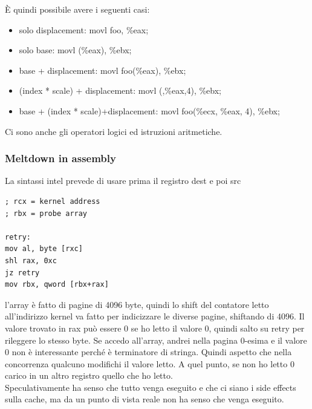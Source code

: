 \documentclass[12pt, oneside]{extbook}
\begin{document}
È quindi possibile avere i seguenti casi:
\begin{itemize}
\item solo displacement: \textsf{movl foo, \%eax};
\item solo base: \textsf{movl (\%eax), \%ebx};
\item base + displacement: \textsf{movl foo(\%eax), \%ebx};
\item (index * scale) + displacement: \textsf{movl (,\%eax,4), \%ebx};
\item base + (index * scale)+displacement: \textsf{movl foo(\%ecx, \%eax, 4), \%ebx};
\end{itemize}
Ci sono anche gli operatori logici ed istruzioni aritmetiche.
\subsubsection{Meltdown in assembly}
La sintassi intel prevede di usare prima il registro dest e poi src
\begin{lstlisting}
; rcx = kernel address
; rbx = probe array

retry:
mov al, byte [rxc]
shl rax, 0xc
jz retry
mov rbx, qword [rbx+rax]
\end{lstlisting}
l'array è fatto di pagine di 4096 byte, quindi lo shift del contatore letto all'indirizzo kernel va fatto per indicizzare le diverse pagine, shiftando di 4096. Il valore trovato in rax può essere 0 se ho letto il valore 0, quindi salto su retry per rileggere lo stesso byte. Se accedo all'array, andrei nella pagina 0-esima e il valore 0 non è interessante perché è terminatore di stringa. Quindi aspetto che nella concorrenza qualcuno modifichi il valore letto. A quel punto, se non ho letto 0 carico in un altro registro quello che ho letto.\\ Speculativamente ha senso che tutto venga eseguito e che ci siano i side effects sulla cache, ma da un punto di vista reale non ha senso che venga eseguito.
\end{document}
